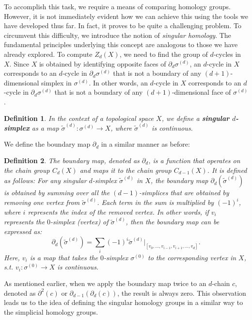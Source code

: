 \documentclass{amsart}
\newtheorem{definition}{Definition}[section]
\begin{document}
To accomplish this task, we require a means of comparing homology groups. However, it is not immediately evident how we can achieve this using the tools we have developed thus far. In fact, it proves to be quite a challenging problem. To circumvent this difficulty, we introduce the notion of \emph{singular homology}. The fundamental principles underlying this concept are analogous to those we have already explored.
To compute $Z_d(X)$, we need to find the group of $d$-cycles in $X$. Since $X$ is obtained by identifying opposite faces of $\partial_d \sigma^{(d)}$, an $d$-cycle in $X$ corresponds to an $d$-cycle in $\partial_d \sigma^{(d)}$ that is not a boundary of any $(d+1)$-dimensional simplex in $\sigma^{(d)}$. In other words, an $d$-cycle in $X$ corresponds to an $d$-cycle in $\partial_d \sigma^{(d)}$ that is not a boundary of any $(d+1)$-dimensional face of $\sigma^{(d)}$.
\begin{definition}
In the context of a topological space $X$, we define a \textbf{singular $d$-simplex} as a map $\tilde{\sigma}^{(d)}: \sigma^{(d)} \rightarrow X$, where $\tilde{\sigma}^{(d)}$ is continuous.
\end{definition}

We define the boundary map $\partial_d$ in a similar manner as before:

\begin{definition}
The boundary map, denoted as $\partial_d$, is a function that operates on the chain group $C_d(X)$ and maps it to the chain group $C_{d-1}(X)$. It is defined as follows: For any singular $d$-simplex $\tilde{\sigma}^{(d)}$ in $X$, the boundary map $\partial_d(\tilde{\sigma}^{(d)})$ is obtained by summing over all the $(d-1)$-simplices that are obtained by removing one vertex from $\tilde{\sigma}^{(d)}$. Each term in the sum is multiplied by $(-1)^i$, where $i$ represents the index of the removed vertex. In other words, if $v_i$ represents the $0$-simplex (vertex) of $\tilde{\sigma}^{(d)}$, then the boundary map can be expressed as:
\begin{equation}
\partial_d(\tilde{\sigma}^{(d)}) = \sum_{i} (-1)^i \tilde{\sigma}^{(d)}\vert_{[v_0,\ldots,v_{i-1},v_{i+1},\ldots,v_d]}.
\end{equation}
Here, $v_i$ is a map that takes the $0$-simplex $\sigma^{(0)}$ to the corresponding vertex in $X$, s.t. $v_i: \sigma^{(0)} \rightarrow X$ is continuous.
\end{definition}

As mentioned earlier, when we apply the boundary map twice to an $d$-chain $c$, denoted as $\partial^2(c)$ or $\partial_{d-1}(\partial_d(c))$, the result is always zero. This observation leads us to the idea of defining the singular homology groups in a similar way to the simplicial homology groups.
\end{document}
